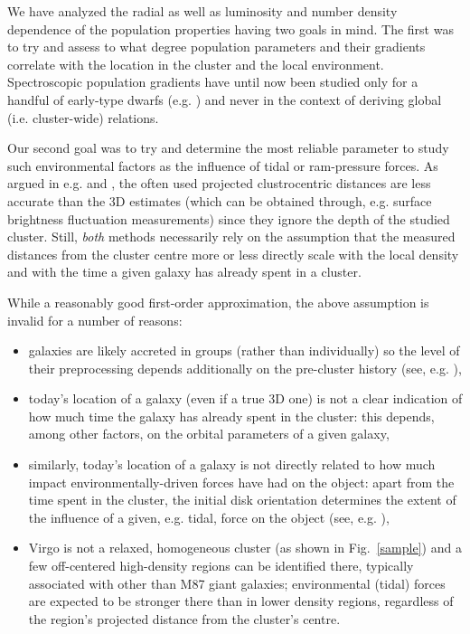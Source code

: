 \documentclass[useAMS,usenatbib]{mn2e}
\begin{document}
We have analyzed the radial as well as luminosity and number density dependence of the population properties having two goals in mind. The first was to try and assess to what degree population parameters and their gradients correlate with the location in the cluster and the local environment. Spectroscopic population gradients have until now been studied only for a handful of early-type dwarfs (e.g. \citealt{koleva:2011}) and never in the context of deriving global (i.e. cluster-wide) relations. 

Our second goal was to try and determine the most reliable parameter to study such environmental factors as the influence of tidal or ram-pressure forces. As argued in e.g. \cite{roediger:2011b} and \cite{rys:2013}, the often used projected clustrocentric distances are less accurate than the 3D estimates (which can be obtained through, e.g. surface brightness fluctuation measurements) since they ignore the depth of the studied cluster. Still, \textit{both} methods necessarily rely on the assumption that the measured distances from the cluster centre more or less directly scale with the local density and with the time a given galaxy has already spent in a cluster.

While a reasonably good first-order approximation, the above assumption is invalid for a number of reasons:
\begin{itemize}
\item galaxies are likely accreted in groups (rather than individually) so the level of their preprocessing depends additionally on the pre-cluster history (see, e.g. \citealt{toloba:2014}),
\item today's location of a galaxy (even if a true 3D one) is not a clear indication of how much time the galaxy has already spent in the cluster: this depends, among other factors, on the orbital parameters of a given galaxy,
\item similarly, today's location of a galaxy is not directly related to how much impact environmentally-driven forces have had on the object: apart from the time spent in the cluster, the initial disk orientation determines the extent of the influence of a given, e.g. tidal, force on the object (see, e.g. \citealt{villalobos:2014}),
\item Virgo is not a relaxed, homogeneous cluster (as shown in Fig.~\ref{sample}) and a few off-centered high-density regions can be identified there, typically associated with other than M87 giant galaxies; environmental (tidal) forces are expected to be stronger there than in lower density regions, regardless of the region's projected distance from the cluster's centre.
\end{itemize}
\end{document}
